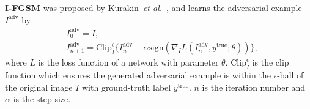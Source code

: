 \documentclass[letterpaper]{article} %
\def\etal{\emph{et al.}}
\begin{document}


\vspace{1ex}\noindent\textbf{I-FGSM} was proposed by Kurakin~\etal~\cite{kurakin2016adversarial}, and learns the adversarial example $I^{\text{adv}}$ by
\begin{equation} \label{eq:IFGSM update}
\begin{split}
&I_{0}^{\text{adv}} = I, \\
&I_{n+1}^{\text{adv}} = \text{Clip}_{I}^{\epsilon} \{I_{n}^{\text{adv}} + \alpha\text{sign}\left(\nabla_{I} L(I_{n}^{\text{adv}}, y^{\text{true}}; \theta)\right)\},
\end{split}
\end{equation}
where $L$ is the loss function of a network with parameter $\theta$. $\text{Clip}_{I}^{\epsilon}$ is the clip function which ensures the generated adversarial example is within the $\epsilon$-ball of the original image $I$ with ground-truth label $y^{\text{true}}$. $n$ is the iteration number and $\alpha$ is the step size.
\end{document}
